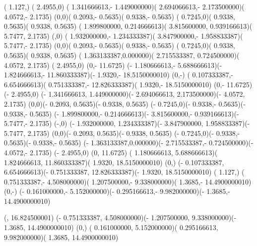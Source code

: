 {    \moveto( 1.127,)
    \rlineto( 2.4955,0)
    \rcurveto( 1.341666613,- 1.449000000)( 2.694066613,- 2.173500000)( 4.0572,- 2.1735)
    \rcurveto(0,0)( 0.2093,- 0.5635)( 0.9338,- 0.5635)
    \rcurveto( 0.7245,0)( 0.9338, 0.5635)( 0.9338, 0.5635)
    \rcurveto( 1.899800000, 0.214666613)( 3.815600000, 0.939166613)( 5.7477, 2.1735)
    \rlineto(,0)
    \rcurveto( 1.932000000,- 1.234333387)( 3.847900000,- 1.958833387)( 5.7477,- 2.1735)
    \rcurveto(0,0)( 0.2093,- 0.5635)( 0.9338,- 0.5635)
    \rcurveto( 0.7245,0)( 0.9338, 0.5635)( 0.9338, 0.5635)
    \rcurveto( 1.363133387,0.000000)( 2.715533387, 0.724500000)( 4.0572, 2.1735)
    \rlineto( 2.4955,0)
    \rlineto(0,- 11.6725)
    \rcurveto(- 1.180666613,- 5.688666613)(- 1.824666613,- 11.860333387)(- 1.9320,- 18.5150000010)
    \rlineto(0,-)
    \rcurveto( 0.107333387,- 6.654666613)( 0.751333387,- 12.826333387)( 1.9320,- 18.5150000010)
    \rlineto(0,- 11.6725)
    \rlineto(- 2.4955,0)
    \rcurveto(- 1.341666613, 1.449000000)(- 2.694066613, 2.173500000)(- 4.0572, 2.1735)
    \rcurveto(0,0)(- 0.2093, 0.5635)(- 0.9338, 0.5635)
    \rcurveto(- 0.7245,0)(- 0.9338,- 0.5635)(- 0.9338,- 0.5635)
    \rcurveto(- 1.899800000,- 0.214666613)(- 3.815600000,- 0.939166613)(- 5.7477,- 2.1735)
    \rlineto(-,0)
    \rcurveto(- 1.932000000, 1.234333387)(- 3.847900000, 1.958833387)(- 5.7477, 2.1735)
    \rcurveto(0,0)(- 0.2093, 0.5635)(- 0.9338, 0.5635)
    \rcurveto(- 0.7245,0)(- 0.9338,- 0.5635)(- 0.9338,- 0.5635)
    \rcurveto(- 1.363133387,0.000000)(- 2.715533387,- 0.724500000)(- 4.0572,- 2.1735)
    \rlineto(- 2.4955,0)
    \rlineto(0, 11.6725)
    \rcurveto( 1.180666613, 5.688666613)( 1.824666613, 11.860333387)( 1.9320, 18.5150000010)
    \rlineto(0,)
    \rcurveto(- 0.107333387, 6.654666613)(- 0.751333387, 12.826333387)(- 1.9320, 18.5150000010)
    \moveto( 1.127,)
    \rcurveto( 0.751333387,- 4.508000000)( 1.207500000,- 9.338000000)( 1.3685,- 14.4900000010)
    \rlineto(0,-)
    \rcurveto(-  0.161000000,- 5.152000000)(- 0.295166613,- 9.982000000)(- 1.3685,- 14.4900000010)

    \moveto(, 16.824500001)
    \rcurveto(- 0.751333387, 4.508000000)(- 1.207500000, 9.338000000)(- 1.3685, 14.4900000010)
    \rlineto(0,)
    \rcurveto(  0.161000000, 5.152000000)( 0.295166613, 9.982000000)( 1.3685, 14.4900000010)
}
